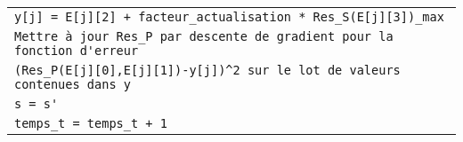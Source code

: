 \begin{tabular}{|l|}
	\hspace{2cm} \verb|y[j] = E[j][2] + facteur_actualisation * Res_S(E[j][3])_max|\\
	\hspace{1cm} \verb|Mettre à jour Res_P par descente de gradient pour la fonction d'erreur|\\
	\hfill \verb|(Res_P(E[j][0],E[j][1])-y[j])^2 sur le lot de valeurs contenues dans y| \\
	\hspace{0.5cm} \verb|s = s'| \\
	\hspace{0.5cm} \verb|temps_t = temps_t + 1| \\
	\hline
\end{tabular}  


\normalsize

